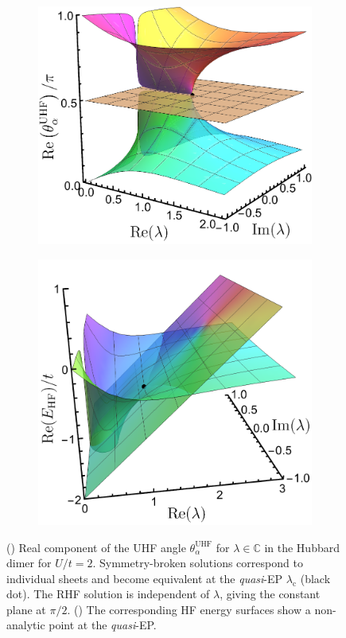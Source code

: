 \documentclass[aps,prb,reprint,noshowkeys,superscriptaddress]{revtex4-1}
\newcommand{\ta}{\theta_{\alpha}}
\newcommand{\bbC}{\mathbb{C}}
\begin{document}
\begin{figure}[t]
	\begin{subfigure}{0.49\textwidth}
    \includegraphics[height=0.65\textwidth,trim={0pt 0pt 0pt -35pt},clip]{fig3a}
	\subcaption{\label{subfig:UHF_cplx_angle}}
    \end{subfigure}
	\begin{subfigure}{0.49\textwidth}
	\includegraphics[height=0.65\textwidth]{fig3b}
	\subcaption{\label{subfig:UHF_cplx_energy}}
    \end{subfigure}
	\caption{%
    () Real component of the UHF angle $\ta^{\text{UHF}}$ for $\lambda \in \bbC$ in the Hubbard dimer for $U/t = 2$.
    Symmetry-broken solutions correspond to individual sheets and become equivalent at 
    the \textit{quasi}-EP $\lambda_{\text{c}}$ (black dot).
    The RHF solution is independent of $\lambda$, giving the constant plane at $\pi/2$.
    () The corresponding HF energy surfaces show a non-analytic 
    point at the \textit{quasi}-EP.
	\label{fig:HF_cplx}}
\end{figure}
\end{document}

